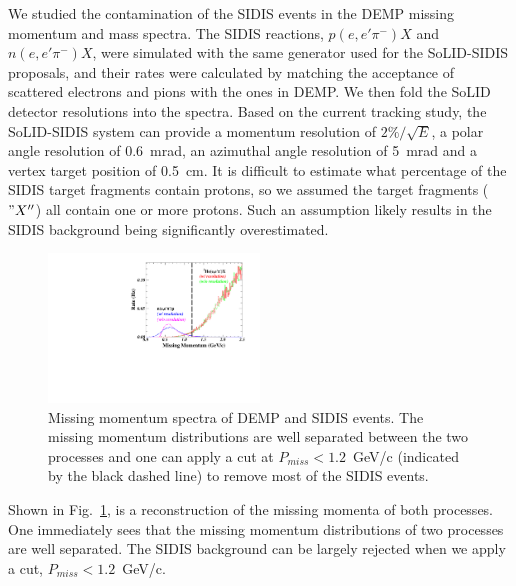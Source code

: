 We studied the contamination of the SIDIS events in the DEMP missing momentum
and mass spectra. The SIDIS reactions, $p(e,e'\pi^{-})X$ and $n(e,e'\pi^{-})X$,
were simulated with the same generator used for the SoLID-SIDIS proposals, and
their rates were calculated by matching the acceptance of scattered electrons
and pions with the ones in DEMP. We then fold the SoLID detector resolutions
into the spectra. Based on the current tracking study, the SoLID-SIDIS system
can provide a momentum resolution of $2\%/\sqrt{E}$, a polar angle
resolution of 0.6~mrad, an azimuthal angle resolution of 5~mrad and a
vertex target position of 0.5~cm. It is difficult to estimate what
percentage of the SIDIS target fragments contain protons, so we assumed
the target fragments ($"X''$) all contain one or more protons. Such an
assumption likely results in the SIDIS background being significantly
overestimated.

\begin{figure}[!ht]
\begin{center}
\includegraphics[type=pdf,ext=.pdf,read=.pdf,width=0.5\textwidth]{./figures/Missing_P_Fermi_Rad_1Hz}
\caption[Missing Momentum]{\footnotesize{Missing momentum spectra of DEMP
and SIDIS events. The missing momentum distributions are well separated between
the two processes and one can apply a cut at $P_{miss}<1.2$~GeV/c (indicated by the
black dashed line) to remove most of the SIDIS events.}}
  \label{missing_mom}
  \end{center}
\end{figure}

Shown in Fig.~\ref{missing_mom}, is a reconstruction of the missing momenta of
both processes. One immediately sees that the missing momentum distributions of
two processes are well separated. The SIDIS background can be largely rejected
when we apply a cut, $P_{miss}<1.2$~GeV/c.

